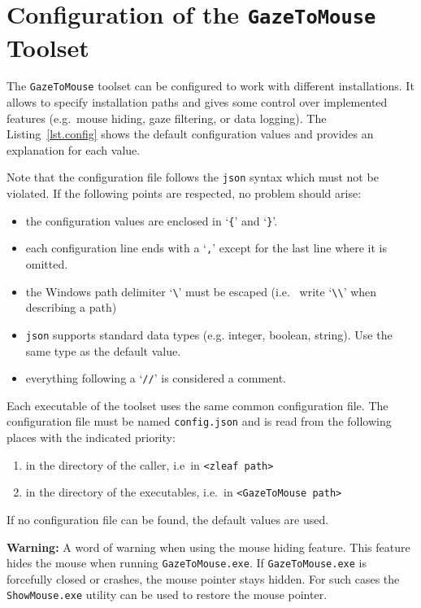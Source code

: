 \documentclass[a4paper,oneside]{book}
\begin{document}
\chapter{Configuration of the \texttt{GazeToMouse} Toolset}
\label{sec.config}
The \texttt{GazeToMouse} toolset can be configured to work with different installations.
It allows to specify installation paths and gives some control over implemented features (e.g.~mouse hiding, gaze filtering, or data logging).
The Listing~\ref{lst.config} shows the default configuration values and provides an explanation for each value.



Note that the configuration file follows the \texttt{json} syntax which must not be violated.
If the following points are respected, no problem should arise:
\begin{itemize}
    \item the configuration values are enclosed in `\texttt{\{}' and `\texttt{\}}'.
    \item each configuration line ends with a `\texttt{,}' except for the last line where it is omitted.
    \item the Windows path delimiter `\texttt{\textbackslash}' must be escaped (i.e.~ write `\texttt{\textbackslash\textbackslash}' when describing a path)
    \item \texttt{json} supports standard data types (e.g. integer, boolean, string).
        Use the same type as the default value.
    \item everything following a `\texttt{//}' is considered a comment.
\end{itemize}

Each executable of the toolset uses the same common configuration file.
The configuration file must be named \texttt{config.json} and is read from the following places with the indicated priority:
\begin{enumerate}
    \item in the directory of the caller, i.e~in \texttt{<zleaf path>}
    \item in the directory of the executables, i.e.~in \texttt{<GazeToMouse path>}
\end{enumerate}
If no configuration file can be found, the default values are used.

\begin{mdframed}[backgroundcolor=boxbkg]\textbf{\color{red}Warning:}
    A word of warning when using the mouse hiding feature.
    This feature hides the mouse when running \texttt{GazeToMouse.exe}.
    If \texttt{GazeToMouse.exe} is forcefully closed or crashes, the mouse pointer stays hidden.
    For such cases the \texttt{ShowMouse.exe} utility can be used to restore the mouse pointer.
\end{mdframed}
\end{document}
